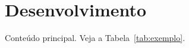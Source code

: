 \section{Desenvolvimento}
\label{sec:desenvolvimento}

Conteúdo principal. Veja a Tabela~\ref{tab:exemplo}.


